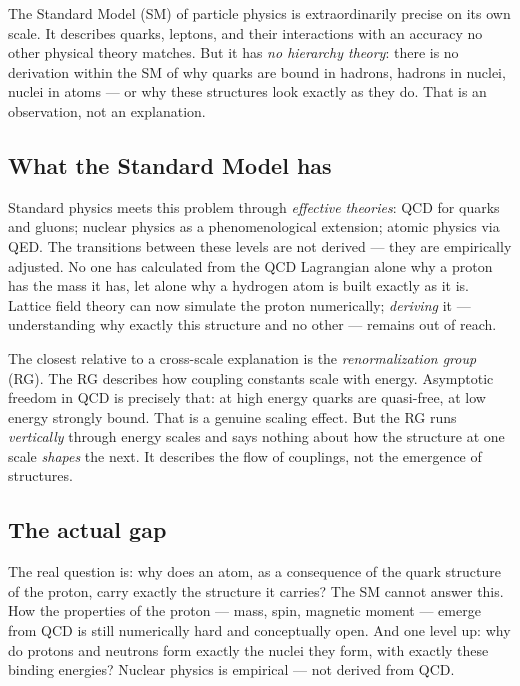 The Standard Model (SM) of particle physics is extraordinarily precise
on its own scale. It describes quarks, leptons, and their interactions
with an accuracy no other physical theory matches. But it has
\emph{no hierarchy theory}: there is no derivation within the SM of
why quarks are bound in hadrons, hadrons in nuclei, nuclei in atoms
--- or why these structures look exactly as they do. That is an
observation, not an explanation.

\subsection*{What the Standard Model has}

Standard physics meets this problem through \emph{effective theories}:
QCD for quarks and gluons; nuclear physics as a phenomenological
extension; atomic physics via QED. The transitions between these
levels are not derived --- they are empirically adjusted. No one has
calculated from the QCD Lagrangian alone why a proton has the mass it
has, let alone why a hydrogen atom is built exactly as it is. Lattice
field theory can now simulate the proton numerically; \emph{deriving}
it --- understanding why exactly this structure and no other ---
remains out of reach.

The closest relative to a cross-scale explanation is the
\emph{renormalization group} (RG). The RG describes how coupling
constants scale with energy. Asymptotic freedom in QCD is precisely
that: at high energy quarks are quasi-free, at low energy strongly
bound. That is a genuine scaling effect. But the RG runs
\emph{vertically} through energy scales and says nothing about how the
structure at one scale \emph{shapes} the next. It describes the flow
of couplings, not the emergence of structures.

\subsection*{The actual gap}

The real question is: why does an atom, as a consequence of the quark
structure of the proton, carry exactly the structure it carries? The
SM cannot answer this. How the properties of the proton --- mass,
spin, magnetic moment --- emerge from QCD is still numerically hard
and conceptually open. And one level up: why do protons and neutrons
form exactly the nuclei they form, with exactly these binding
energies? Nuclear physics is empirical --- not derived from QCD.

